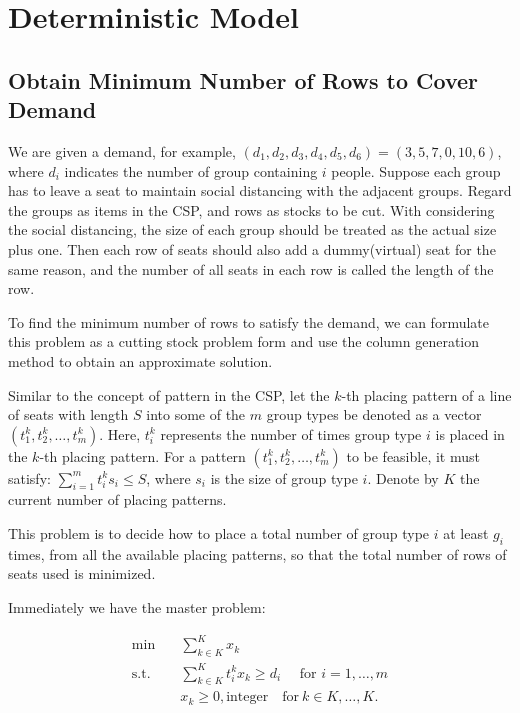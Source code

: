 \section{Deterministic Model}

\subsection{Obtain Minimum Number of Rows to Cover Demand}

We are given a demand, for example, $(d_1, d_2, d_3, d_4, d_5, d_6) = (3,5,7,0,10,6)$, where $d_i$ indicates the number of group containing $i$ people. Suppose each group has to leave a seat to maintain social distancing with the adjacent groups. Regard the groups as items in the CSP, and rows as stocks to be cut.
With considering the social distancing, the size of each group should be treated as the actual size plus one. Then each row of seats should also add a dummy(virtual) seat for the same reason, and the number of all seats in each row is called the length of the row.

To find the minimum number of rows to satisfy the demand, we can formulate this problem as a cutting stock problem form and use the column generation method to obtain an approximate solution.

Similar to the concept of pattern in the CSP, let the $k$-th placing pattern of a line of seats with length $S$ into some of the $m$ group types be denoted as a vector $(t^k_1,t^k_2,\ldots,t^k_m)$. Here, $t^k_i$ represents the number of times group type $i$ is placed in the $k$-th placing pattern. For a pattern $(t^k_1,t^k_2,\ldots,t^k_m)$ to be feasible, it must satisfy: $\sum_{i=1}^m t^k_i s_i \leq S$, where $s_i$ is the size of group type $i$. Denote by $K$ the current number of placing patterns.


This problem is to decide how to place a total number of group type $i$ at least $g_i$ times, from all the available placing patterns, so that the total number of rows of seats used is minimized.

Immediately we have the master problem:

\[\begin{split}\mbox{min}\quad & \sum_{k \in K}^K x_{k}\\
 \mbox{s.t.} \quad & \sum_{k \in K}^K t_i^k x_k \geq d_i  \quad  \mbox{ for } i=1,\ldots,m \\
  & x_k \geq 0, \mbox{integer}\quad \mbox{for}~ k \in K,\ldots,K.\\
\end{split}\]

